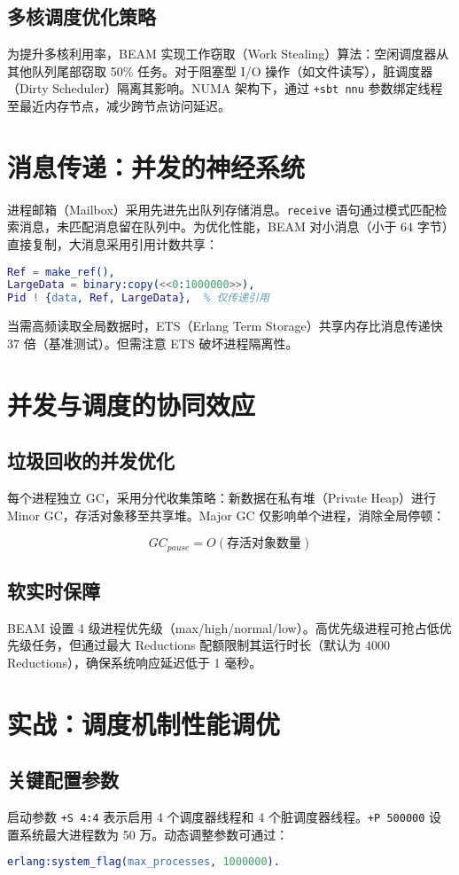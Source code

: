 \section{多核调度优化策略}
为提升多核利用率，BEAM 实现工作窃取（Work Stealing）算法：空闲调度器从其他队列尾部窃取 50\%{} 任务。对于阻塞型 I/O 操作（如文件读写），脏调度器（Dirty Scheduler）隔离其影响。NUMA 架构下，通过 \texttt{+sbt nnu} 参数绑定线程至最近内存节点，减少跨节点访问延迟。\par
\chapter{消息传递：并发的神经系统}
进程邮箱（Mailbox）采用先进先出队列存储消息。\texttt{receive} 语句通过模式匹配检索消息，未匹配消息留在队列中。为优化性能，BEAM 对小消息（小于 64 字节）直接复制，大消息采用引用计数共享：\par
\begin{lstlisting}[language=erlang]
% 大消息传递优化（引用计数）
Ref = make_ref(),
LargeData = binary:copy(<<0:1000000>>),
Pid ! {data, Ref, LargeData},  % 仅传递引用
\end{lstlisting}
当需高频读取全局数据时，ETS（Erlang Term Storage）共享内存比消息传递快 37 倍（基准测试）。但需注意 ETS 破坏进程隔离性。\par
\chapter{并发与调度的协同效应}
\section{垃圾回收的并发优化}
每个进程独立 GC，采用分代收集策略：新数据在私有堆（Private Heap）进行 Minor GC，存活对象移至共享堆。Major GC 仅影响单个进程，消除全局停顿：\par
$$GC_{pause} = O(存活对象数量)$$\par
\section{软实时保障}
BEAM 设置 4 级进程优先级（max/high/normal/low）。高优先级进程可抢占低优先级任务，但通过最大 Reductions 配额限制其运行时长（默认为 4000 Reductions），确保系统响应延迟低于 1 毫秒。\par
\chapter{实战：调度机制性能调优}
\section{关键配置参数}
启动参数 \texttt{+S 4:4} 表示启用 4 个调度器线程和 4 个脏调度器线程。\texttt{+P 500000} 设置系统最大进程数为 50 万。动态调整参数可通过：\par
\begin{lstlisting}[language=erlang]
% 运行时调整最大进程数
erlang:system_flag(max_processes, 1000000).
\end{lstlisting}
